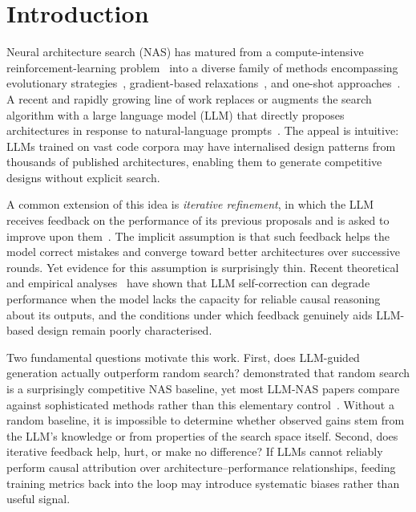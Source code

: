 \documentclass[10pt]{article}
\begin{document}
\section{Introduction}
\label{sec:intro}

Neural architecture search (NAS) has matured from a compute-intensive
reinforcement-learning problem~\citep{zoph2017nas} into a diverse family of
methods encompassing evolutionary strategies~\citep{real2019regularized},
gradient-based relaxations~\citep{liu2019darts}, and one-shot
approaches~\citep{pham2018enas}.  A recent and rapidly growing line of work
replaces or augments the search algorithm with a large language model (LLM) that
directly proposes architectures in response to natural-language
prompts~\citep{chen2023evoprompting,zheng2023genius,nasir2024llmatic}.  The
appeal is intuitive: LLMs trained on vast code corpora may have internalised
design patterns from thousands of published architectures, enabling them to
generate competitive designs without explicit search.

A common extension of this idea is \emph{iterative refinement}, in which the LLM
receives feedback on the performance of its previous proposals and is asked to
improve upon them~\citep{madaan2023selfrefine,shinn2023reflexion}.  The implicit
assumption is that such feedback helps the model correct mistakes and converge
toward better architectures over successive rounds.  Yet evidence for this
assumption is surprisingly thin.  Recent theoretical and empirical
analyses~\citep{huang2024selfcorrection,stechly2024selfverification,
valmeekam2023planbench} have shown that LLM self-correction can degrade
performance when the model lacks the capacity for reliable causal reasoning
about its outputs, and the conditions under which feedback genuinely aids
LLM-based design remain poorly characterised.

Two fundamental questions motivate this work.  First, does LLM-guided generation
actually outperform random search?  \citet{li2020random} demonstrated that random
search is a surprisingly competitive NAS baseline, yet most LLM-NAS papers
compare against sophisticated methods rather than this elementary
control~\citep{yang2020evaluating}.  Without a random baseline, it is impossible
to determine whether observed gains stem from the LLM's knowledge or from
properties of the search space itself.  Second, does iterative feedback help,
hurt, or make no difference?  If LLMs cannot reliably perform causal attribution
over architecture--performance relationships, feeding training metrics back into
the loop may introduce systematic biases rather than useful signal.
\end{document}
